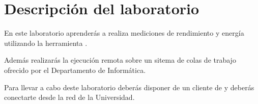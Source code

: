 \section{Descripción del laboratorio}

En este laboratorio aprenderás a realiza mediciones de rendimiento y energía
utilizando la herramienta .

Además realizarás la ejecución remota sobre un sitema de colas de trabajo 
ofrecido por el Departamento de Informática.

Para llevar a cabo deste laboratorio deberás disponer de un cliente de 
y deberás conectarte desde la red de la Universidad.

